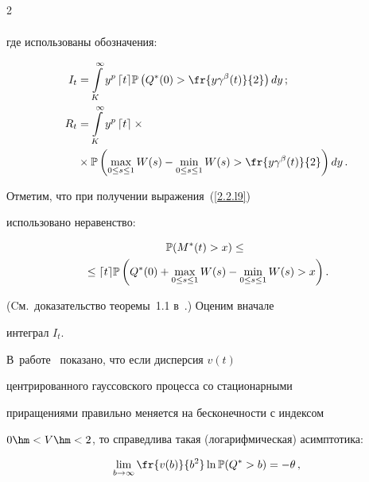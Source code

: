 \begin{multicols}{2}
\begin{multline}
\end{multline}


где использованы обозначения:


\begin{align*}


I_t&=\int\limits_{K}^\infty y^p \,\lceil t\rceil\Pu\left(Q^*(0)>\fr{y


\gamma^\beta(t)}{2}\right)dy\,;\\


 R_t&=\int\limits_{K}^\infty y^p\, \lceil t \rceil \times{}\\


& {}\times \Pu\left(


 \max\limits_{0\leq s \leq 1}W(s)-\min\limits_{0 \leq s \leq 1}W(s)>\fr{y


\gamma^\beta(t)}{2}\right)dy\,.


\end{align*}


Отметим, что при получении выражения~(\ref{2.2.l9})


использовано неравенство:


\begin{multline*}


\Pu(M^*(t)>x) \le {}\\


{}\le \lceil t\rceil\Pu\left(Q^*(0)+


\max\limits_{0 \leq s \leq 1}W(s)-\min\limits_{0 \leq s \leq 1} W(s)>x\right).


\end{multline*}


(Cм.\ доказательство теоремы~1.1 в~\cite{Lukashenko}.) Оценим вначале


 интеграл $I_t$.


 В~работе~\cite{Duffy} показано, что если дисперсия $v(t)$


 центрированного гауссовского процесса со стационарными


приращениями  правильно меняется на бесконечности  с индексом


$0\hm<V\hm<2$, то справедлива такая (логарифмическая) асимптотика:


\begin{equation}


\lim\limits_{b \to \infty} \fr{v(b)}{b^2} \ln \Pu(Q^*>b)=-\theta\,,


\label{asymp1-l13}


\end{equation}



\end{multicols}
